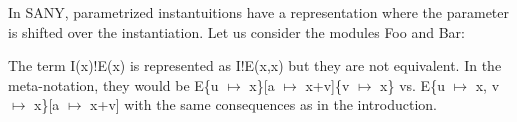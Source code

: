 \documentclass[a4paper]{article}
\newcommand{\tla}[1]{#1}
\begin{document}
In SANY, parametrized instantuitions have a representation where the
 parameter is shifted over the instantiation. Let us consider the
 modules Foo and Bar:

\begin{parcolumns}{2}
\end{parcolumns}

The term \tla{I(x)!E(x)} is represented as \tla{I!E(x,x)} but they are
 not equivalent. In the meta-notation, they would be
 E\{u $\mapsto$ x\}[a $\mapsto$ x+v]\{v $\mapsto$ x\} vs. E\{u $\mapsto$ x,
 v $\mapsto$ x\}[a $\mapsto$ x+v] with the same consequences as in the
 introduction.

\vspace{2cm}
\end{document}
